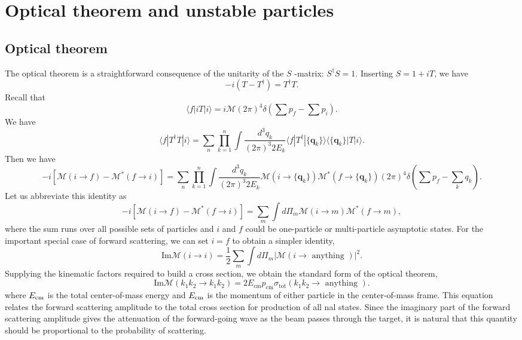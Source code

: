 \section{Optical theorem and unstable particles}
\subsection{Optical theorem}
The optical theorem is a straightforward consequence of the unitarity of the $S$ -matrix: $S^{\dagger}S = 1$. 
Inserting $S = 1 + iT$, we have
\[-i(T - T^{\dagger}) = T^{\dagger}T.\]
Recall that
\[\langle f | iT | i \rangle = i\mathcal{M}(2\pi)^4\delta(\sum p_f - \sum p_i).\]
We have
\[\langle f | T^{\dagger}T | i \rangle = \sum_n \prod_{k=1}^n \int \frac{d^3q_k}{(2\pi)^3 2E_k} \langle f | T^{\dagger} | \{\bm{q}_k\} \rangle \langle \{\bm{q}_k\} | T | i \rangle.\]
Then we have
\[-i[\mathcal{M}(i \to f) - \mathcal{M}^{*}(f \to i)] =  \sum_n \prod_{k=1}^n \int \frac{d^3q_k}{(2\pi)^3 2E_k} \mathcal{M}(i \to \{\bm{q}_k\}) \mathcal{M}^{*}(f \to \{\bm{q}_k\}) (2\pi)^4 \delta(\sum p_f- \sum_k q_k).\]
Let us abbreviate this identity as
\[-i[\mathcal{M}(i \to f) - \mathcal{M}^{*}(f \to i)] = \sum_m \int d\Pi_{m} \mathcal{M}(i \to m) \mathcal{M}^{*}(f \to m),\]
where the sum runs over all possible sets of particles and $i$ and $f$ could be one-particle or multi-particle asymptotic states.
For the important special case of forward scattering, we can set $i = f$ to obtain a simpler identity,
\[\mathrm{Im} \mathcal{M}(i \to i) = \frac{1}{2} \sum_m \int d\Pi_{m} |\mathcal{M}(i \to \mbox{ anything })|^2.\]
Supplying the kinematic factors required to build a cross section, we obtain the standard form of the optical theorem,
\[\mathrm{Im} \mathcal{M}(k_1k_2 \to k_1k_2) = 2E_{\mathrm{cm}}p_{\mathrm{cm}}\sigma_{\mathrm{tot}}(k_1k_2 \to \mbox{ anything }).\]
where $E_{\rm cm}$ is the total center-of-mass energy and $E_{\rm cm}$ is the momentum of either particle in the center-of-mass frame. 
This equation relates the forward scattering amplitude to the total cross section for production of all nal states. 
Since the imaginary part of the forward scattering amplitude gives the attenuation of the forward-going wave as the beam passes through the target, it is natural that this quantity should be proportional to the probability of scattering.


